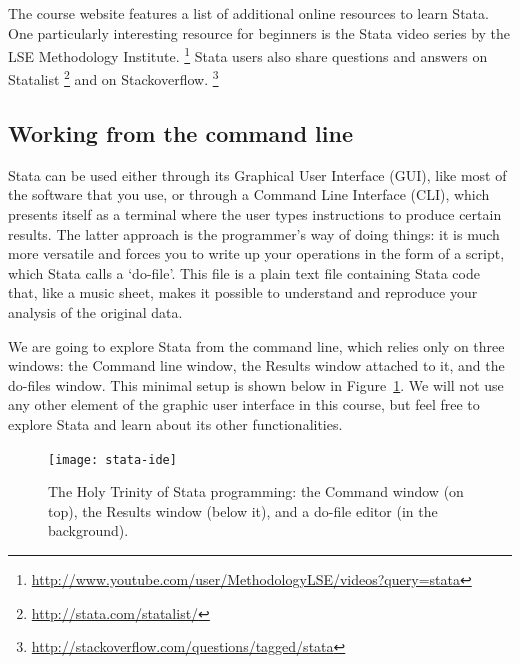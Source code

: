 The course website features a list of additional online resources to learn Stata. One particularly interesting resource for beginners is the Stata video series by the LSE Methodology Institute.%
  \footnote{\url{http://www.youtube.com/user/MethodologyLSE/videos?query=stata}} %
  Stata users also share questions and answers on Statalist%
  \footnote{\url{http://stata.com/statalist/}} %
  and on Stackoverflow.%
  \footnote{\url{http://stackoverflow.com/questions/tagged/stata}}

%
%
%
%
%
\subsection{Working from the command line} %
%
%
Stata can be used either through its Graphical User Interface (GUI), like most of the software that you use, or through a Command Line Interface (CLI), which presents itself as a terminal where the user types instructions to produce certain results. The latter approach is the programmer's way of doing things: it is much more versatile and forces you to write up your operations in the form of a script, which Stata calls a `do-file'. This file is a plain text file containing Stata code that, like a music sheet, makes it possible to understand and reproduce your analysis of the original data.%

We are going to explore Stata from the command line, which relies only on three windows: the Command line window, the Results window attached to it, and the do-files window. This minimal setup is shown below in Figure~\ref{fig:stata-ide}. We will not use any other element of the graphic user interface in this course, but feel free to explore Stata and learn about its other functionalities.%

\begin{figure}
	\texttt{[image: stata-ide]}%
	\caption{The Holy Trinity of Stata programming: the Command window (on top), the Results window (below it), and a do-file editor (in the background).}%
	\label{fig:stata-ide}%
\end{figure}



